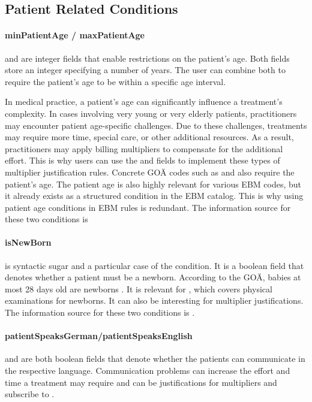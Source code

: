\subsection{Patient Related Conditions}\label{subsec:patient-related-conditions}

\paragraph{minPatientAge / maxPatientAge}
 and  are integer fields that enable restrictions on the patient's age.
Both fields store an integer specifying a number of years.
The user can combine both to require the patient's age to be within a specific age interval.

In medical practice, a patient's age can significantly influence a treatment's complexity.
In cases involving very young or very elderly patients, practitioners may encounter patient age-specific challenges.
Due to these challenges, treatments may require more time, special care, or other additional resources.
As a result, practitioners may apply billing multipliers to compensate for the additional effort.
This is why users can use the \minPatientAge and \maxPatientAge fields to implement these types of multiplier justification rules.
Concrete GOÄ codes such as  and  also require the patient's age.
The patient age is also highly relevant for various EBM codes, but it already exists as a structured condition in the EBM catalog.
This is why using patient age conditions in EBM rules is redundant.
The information source for these two conditions is 


\paragraph{isNewBorn}
\isNewBorn is syntactic sugar and a particular case of the \maxPatientAge condition.
It is a boolean field that denotes whether a patient must be a newborn.
According to the GOÄ, babies at most 28 days old are newborns \cite{bruck1998kommentar}.
It is relevant for , which covers physical examinations for newborns.
It can also be interesting for multiplier justifications.
The information source for these two conditions is .

\paragraph{patientSpeaksGerman/patientSpeaksEnglish}
\patientSpeaksGerman and \patientSpeaksEnglish are both boolean fields that denote whether the patients can communicate in the respective language.
Communication problems can increase the effort and time a treatment may require and can be justifications for multipliers
\patientSpeaksGerman and \patientSpeaksEnglish subscribe to .

